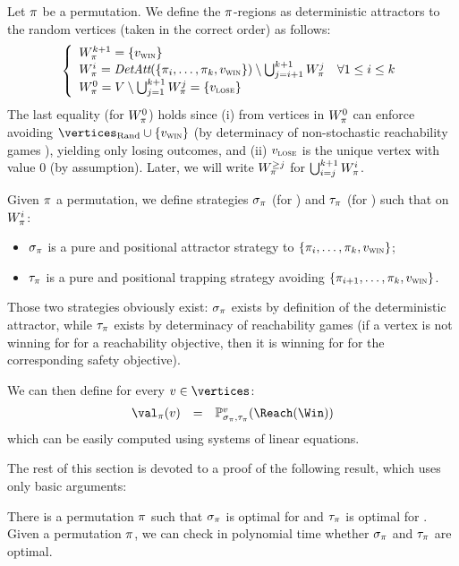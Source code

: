 Let $\pi$ be a permutation. We define the $\pi$-regions as
deterministic attractors to the random vertices (taken in the correct
order) as follows:
\[
\left\{
\begin{array}{l}
  W_\pi^{k+1}  = \{v_{\textsc{win}}\} \\
  W_\pi^i =
  \textit{DetAtt}(\{\pi_i,\ldots,\pi_k,v_{\textsc{win}}\}) \setminus \bigcup_{j=i+1}^{k+1}
  W_\pi^j\quad \forall 1 \le i \le k \\ 
  W_\pi^0 = V \setminus \bigcup_{j=1}^{k+1} W_\pi^j = \{v_{\textsc{lose}}\}
\end{array}
\right.
\]
The last equality (for $W_\pi^0$) holds since (i) from vertices in
$W_\pi^0$ \Adam can enforce avoiding $\Randomvertices \cup
\{\vwin\}$ (by determinacy of non-stochastic reachability games
), yielding only losing outcomes, and
(ii) $v_{\textsc{lose}}$ is the unique vertex with value $0$ (by
assumption). Later, we will write $W_\pi^{\ge j}$ for
$\bigcup_{i=j}^{k+1} W_\pi^i$.

Given $\pi$ a permutation, we define strategies $\sigma_\pi$ (for
\Eve) and $\tau_\pi$ (for \Adam) such that on $W_\pi^i$:
\begin{itemize}
\item $\sigma_\pi$ is a pure and positional attractor strategy to
  $\{\pi_i,\ldots,\pi_k,v_{\textsc{win}}\}$;
\item $\tau_\pi$ is a pure and positional trapping strategy avoiding
  $\{\pi_{i+1},\ldots,\pi_k,v_{\textsc{win}}\}$.
\end{itemize}
Those two strategies obviously exist: $\sigma_\pi$ exists by
definition of the deterministic attractor, while $\tau_\pi$ exists
by determinacy of reachability games (if a vertex is not winning for
\Eve for a reachability objective, then it is winning for \Adam for
the corresponding safety objective).

We can then define for every $v \in \vertices$:
\[
\begin{array}{rcl}
\val_\perm(v) &=& \probm_{\sigma_\perm,\tau_\perm}^v(\Reach(\Win))
\end{array}
\]
which can be easily computed using systems of linear
equations. %


The rest of this section is devoted to a proof of the following
result, which uses only basic arguments:

\begin{theorem}
  \label{6-thm:corr-strat-improv}
  There is a permutation $\pi$ such that $\sigma_\pi$ is optimal
  for \Eve and $\tau_\pi$ is optimal for \Adam. Given a permutation
  $\pi$, we can check in polynomial time whether $\sigma_\pi$ and
  $\tau_\pi$ are optimal.
\end{theorem}

